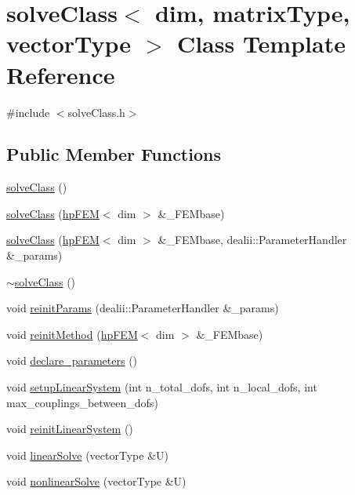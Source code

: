 \section{solve\-Class$<$ dim, matrix\-Type, vector\-Type $>$ Class Template Reference}
\label{classsolve_class}


{\ttfamily \#include $<$solve\-Class.\-h$>$}

\subsection*{Public Member Functions}
\begin{DoxyCompactItemize}
\item 
\hyperlink{classsolve_class_ac210b30d39cb640ec4d65b667467583d}{solve\-Class} ()
\item 
\hyperlink{classsolve_class_ada67813836ea60d10b21940008f37585}{solve\-Class} (\hyperlink{classhp_f_e_m}{hp\-F\-E\-M}$<$ dim $>$ \&\-\_\-\-F\-E\-Mbase)
\item 
\hyperlink{classsolve_class_a50fb5916f24e3b239ff60602c31cc536}{solve\-Class} (\hyperlink{classhp_f_e_m}{hp\-F\-E\-M}$<$ dim $>$ \&\-\_\-\-F\-E\-Mbase, dealii\-::\-Parameter\-Handler \&\-\_\-params)
\item 
\hyperlink{classsolve_class_a827189cdd4bd715d08e4cda1695c8409}{$\sim$solve\-Class} ()
\item 
void \hyperlink{classsolve_class_aa4ad1317ebf556afc0f3ffeed490dbb4}{reinit\-Params} (dealii\-::\-Parameter\-Handler \&\-\_\-params)
\item 
void \hyperlink{classsolve_class_a586d70f40869aa09462cc19291702910}{reinit\-Method} (\hyperlink{classhp_f_e_m}{hp\-F\-E\-M}$<$ dim $>$ \&\-\_\-\-F\-E\-Mbase)
\item 
void \hyperlink{classsolve_class_aec50a8e099e0110e5f8186a9ad9d0120}{declare\-\_\-parameters} ()
\item 
void \hyperlink{classsolve_class_abcdd7b865378898804f4831f0a078e04}{setup\-Linear\-System} (int n\-\_\-total\-\_\-dofs, int n\-\_\-local\-\_\-dofs, int max\-\_\-couplings\-\_\-between\-\_\-dofs)
\item 
void \hyperlink{classsolve_class_ab8aad4ce80f4f6fe8532c53e4bba67ec}{reinit\-Linear\-System} ()
\item 
void \hyperlink{classsolve_class_a9e6755b7d81862d2a8412de1eec855a7}{linear\-Solve} (vector\-Type \&U)
\item 
void \hyperlink{classsolve_class_aa848c866771bf63f69e8ff35d4c947aa}{nonlinear\-Solve} (vector\-Type \&U)

\end{DoxyCompactItemize}
